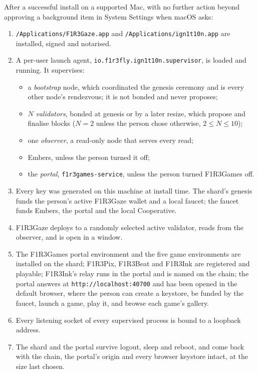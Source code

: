 \documentclass[11pt]{article}
\theoremstyle{definition}
\theoremstyle{remark}
\newcommand{\code}[1]{\texttt{#1}}
\newcommand{\Gz}{F1R3Gaze}
\newcommand{\Gm}{F1R3Games}
\newcommand{\Svc}{\code{f1r3games-service}}
\newcommand{\Em}{Embers}
\begin{document}
After a successful install on a supported Mac, with no further action beyond
approving a background item in System Settings when macOS asks:

\begin{enumerate}[nosep]
\item \code{/Applications/F1R3Gaze.app} and \code{/Applications/ign1t10n.app} are
  installed, signed and notarised.
\item A per-user launch agent, \code{io.f1r3fly.ign1t10n.supervisor}, is loaded and
  running. It supervises:
  \begin{itemize}[nosep]
  \item a \emph{bootstrap} node, which coordinated the genesis ceremony and is every
    other node's rendezvous; it is not bonded and never proposes;
  \item $N$ \emph{validators}, bonded at genesis or by a later resize, which propose
    and finalise blocks ($N = 2$ unless the person chose otherwise, $2 \le N \le 10$);
  \item one \emph{observer}, a read-only node that serves every read;
  \item \Em{}, unless the person turned it off;
  \item the \emph{portal}, \Svc{}, unless the person turned \Gm{} off.
  \end{itemize}
\item Every key was generated on this machine at install time. The shard's genesis
  funds the person's active \Gz{} wallet and a local faucet; the faucet funds \Em{},
  the portal and the local Cooperative.
\item \Gz{} deploys to a randomly selected active validator, reads from the observer,
  and is open in a window.
\item The \Gm{} portal environment and the five game environments are installed on
  the shard; F1R3Pix, F1R3Beat and F1R3Ink are registered and playable; F1R3Ink's
  relay runs in the portal and is named on the chain; the portal answers at
  \code{http://localhost:40700} and has been opened in the default browser, where the
  person can create a keystore, be funded by the faucet, launch a game, play it, and
  browse each game's gallery.
\item Every listening socket of every supervised process is bound to a loopback
  address.
\item The shard and the portal survive logout, sleep and reboot, and come back with
  the chain, the portal's origin and every browser keystore intact, at the size last
  chosen.
\end{enumerate}
\end{document}
